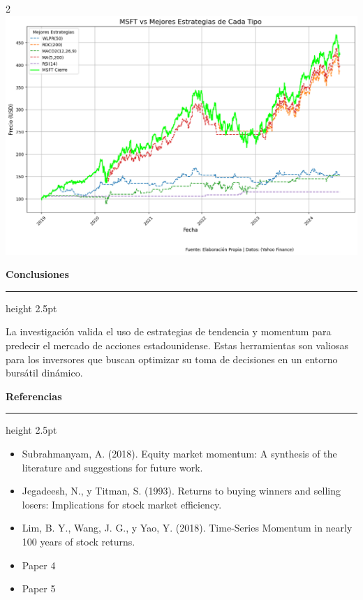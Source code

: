 \documentclass[a0,portrait]{a0poster}
\newcommand{\customsection}[1]{
    \begin{center}
        \vspace{1cm} %
        \color{black}
        \textbf{\Huge #1}
        \color{miRojo}
        \vspace{.5cm} %
        \hrule height 2.5pt  %
        \vspace{.5cm} %
    \end{center}
}
\begin{document}
\begin{multicols}{2}
    \includegraphics[width=0.9\linewidth]{grafico_mejores_estrategias_MSFT.png}
    \customsection{Conclusiones}
    \par
    \indent La investigación valida el uso de estrategias de tendencia y momentum para predecir el mercado de acciones estadounidense. Estas herramientas son valiosas para los inversores que buscan optimizar su toma de decisiones en un entorno bursátil dinámico. 
    \customsection{Referencias}
    \par
         \begin{itemize}
            \item Subrahmanyam, A. (2018). Equity market momentum: A synthesis of the literature and suggestions for future work.
            \item Jegadeesh, N., y Titman, S. (1993). Returns to buying winners and selling losers: Implications for stock market efficiency.
            \item Lim, B. Y., Wang, J. G., y Yao, Y. (2018). Time-Series Momentum in nearly 100 years of stock returns.            \item Paper 4
            \item Paper 5
        \end{itemize}
        
    
    
    
    
\end{multicols}
\end{document}
